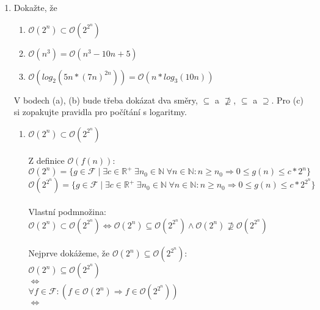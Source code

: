 \documentclass[a4paper,11pt]{article}[24.3.2010]
\begin{document}
\begin{enumerate}
\newpage
\item Dokažte, že
\renewcommand{\theenumi}{\alph{enumi}}
\begin{enumerate}
\item $\mathcal{O}(2^n) \subset \mathcal{O}(2^{2^n})$
\item $\mathcal{O}(n^3) = \mathcal{O}(n^3 - 10n + 5)$
\item $\mathcal{O}(log_{2}(5n*(7n)^{2n})) = \mathcal{O}(n*log_{3}(10n))$
\end{enumerate}
\renewcommand{\theenumi}{\arabic{enumi}}
V bodech (a), (b) bude třeba dokázat dva směry, $\subseteq$ a $\not\supseteq$, $\subseteq$ a $\supseteq$. Pro (c) si zopakujte pravidla pro počítání s logaritmy.
\renewcommand{\theenumi}{\alph{enumi}}
\begin{enumerate}
\item $\mathcal{O}(2^n) \subset \mathcal{O}(2^{2^n})$\\\\
Z definice $\mathcal{O}(f(n))$:\\
      $\mathcal{O}(2^n) = \{g \in \mathcal{F} \mid \exists c \in \mathbb{R}^+ \hspace{3pt} \exists n_{0} \in \mathbb{N} \hspace{3pt} \forall n \in \mathbb{N} : n \geq n_{0} \Rightarrow 0 \leq g(n) \leq c*2^n\}$\\
      $\mathcal{O}(2^{2^n}) = \{g \in \mathcal{F} \mid \exists c \in \mathbb{R}^+ \hspace{3pt} \exists n_{0} \in \mathbb{N} \hspace{3pt} \forall n \in \mathbb{N} : n \geq n_{0} \Rightarrow 0 \leq g(n) \leq c*2^{2^n}\}$\\\\
      Vlastní podmnožina:\\
      $\mathcal{O}(2^n) \subset \mathcal{O}(2^{2^n}) \Leftrightarrow \mathcal{O}(2^n) \subseteq \mathcal{O}(2^{2^n}) \wedge \mathcal{O}(2^n) \not\supseteq \mathcal{O}(2^{2^n})$\\\\
      Nejprve dokážeme, že $\mathcal{O}(2^n) \subseteq \mathcal{O}(2^{2^n})$:\\
      $\mathcal{O}(2^n) \subseteq \mathcal{O}(2^{2^n})$\\
      $\Leftrightarrow$\\
      $\forall f \in \mathcal{F} : (f \in \mathcal{O}(2^n) \Rightarrow f \in \mathcal{O}(2^{2^n}))$\\
      $\Leftrightarrow$\\

\end{enumerate}
\end{enumerate}
\end{document}
